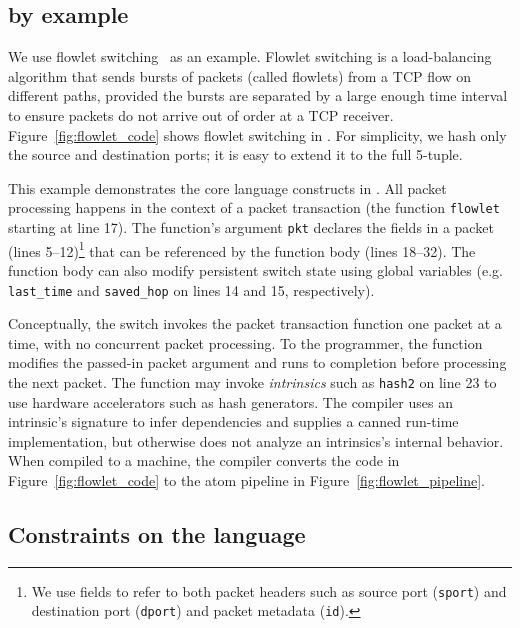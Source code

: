 \subsection{\pktlanguage by example}
\label{ss:flowlet}


We use flowlet switching~\cite{flowlets} as an example. Flowlet
switching is a load-balancing algorithm that sends bursts of packets
(called flowlets) from a TCP flow on different paths, provided the
bursts are separated by a large enough time interval to ensure packets
do not arrive out of order at a TCP
receiver. Figure~\ref{fig:flowlet_code} shows flowlet switching in
\pktlanguage. For simplicity, we hash only the source and destination
ports; it is easy to extend it to the full 5-tuple.

This example demonstrates the core language constructs in
\pktlanguage. All packet processing happens in the context of a packet
transaction (the function \texttt{flowlet} starting at line 17). The
function's argument {\tt pkt} declares the fields in a packet (lines
5--12)\footnote{We use fields to refer to both packet headers such as
  source port ({\tt sport}) and destination port ({\tt dport}) and
  packet metadata ({\tt id}).} that can be referenced by the function
body (lines 18--32).  The function body can also modify persistent
switch state using global variables (e.g.  \texttt{last\_time} and
\texttt{saved\_hop} on lines 14 and 15, respectively).

Conceptually, the switch invokes the packet transaction function one
packet at a time, with no concurrent packet processing. To the
programmer, the function modifies the passed-in packet argument and
runs to completion before processing the next packet.  The function
may invoke \textit{intrinsics} such as \texttt{hash2} on line 23 to
use hardware accelerators such as hash generators.  The \pktlanguage
compiler uses an intrinsic's signature to infer dependencies and
supplies a canned run-time implementation, but otherwise does not
analyze an intrinsics's internal behavior. When compiled to a
\absmachine machine, the compiler converts the code in
Figure~\ref{fig:flowlet_code} to the atom pipeline in
Figure~\ref{fig:flowlet_pipeline}.

\subsection{Constraints on the language}
\label{ss:constraints}

